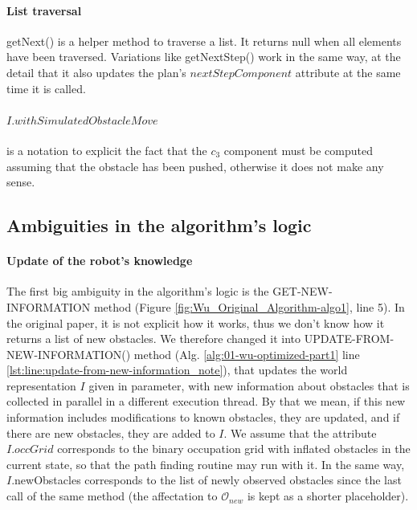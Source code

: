 \paragraph{List traversal} getNext() is a helper method to traverse a list. It returns null when all elements have been traversed. Variations like getNextStep() work in the same way, at the detail that it also updates the plan's $nextStepComponent$ attribute at the same time it is called.

\paragraph{$I.withSimulatedObstacleMove$} is a notation to explicit the fact that the $c_{3}$ component must be computed assuming that the obstacle has been pushed, otherwise it does not make any sense.

\subsection{Ambiguities in the algorithm's logic}

\paragraph{Update of the robot's knowledge} The first big ambiguity in the algorithm's logic is the GET-NEW-INFORMATION method (Figure \ref{fig:Wu_Original_Algorithm-algo1}, line 5). In the original paper, it is not explicit how it works, thus we don't know how it returns a list of new obstacles. We therefore changed it into UPDATE-FROM-NEW-INFORMATION() method (Alg. \ref{alg:01-wu-optimized-part1} line \ref{lst:line:update-from-new-information_note}), that updates the world representation $I$ given in parameter, with new information about obstacles that is collected in parallel in a different execution thread. By that we mean, if this new information includes modifications to known obstacles, they are updated, and if there are new obstacles, they are added to $I$. We assume that the attribute $I.occGrid$ corresponds to the binary occupation grid with inflated obstacles in the current state, so that the path finding routine may run with it. In the same way, $I$.newObstacles corresponds to the list of newly observed obstacles since the last call of the same method (the affectation to $\mathcal{O}_{new}$ is kept as a shorter placeholder).

